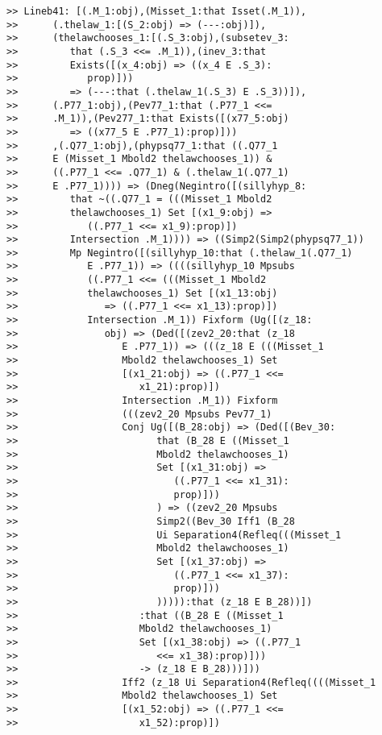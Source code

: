 \documentclass[12pt]{article}
\begin{document}
\begin{verbatim}
>> Lineb41: [(.M_1:obj),(Misset_1:that Isset(.M_1)),
>>      (.thelaw_1:[(S_2:obj) => (---:obj)]),
>>      (thelawchooses_1:[(.S_3:obj),(subsetev_3:
>>         that (.S_3 <<= .M_1)),(inev_3:that
>>         Exists([(x_4:obj) => ((x_4 E .S_3):
>>            prop)]))
>>         => (---:that (.thelaw_1(.S_3) E .S_3))]),
>>      (.P77_1:obj),(Pev77_1:that (.P77_1 <<=
>>      .M_1)),(Pev277_1:that Exists([(x77_5:obj)
>>         => ((x77_5 E .P77_1):prop)]))
>>      ,(.Q77_1:obj),(phypsq77_1:that ((.Q77_1
>>      E (Misset_1 Mbold2 thelawchooses_1)) &
>>      ((.P77_1 <<= .Q77_1) & (.thelaw_1(.Q77_1)
>>      E .P77_1)))) => (Dneg(Negintro([(sillyhyp_8:
>>         that ~((.Q77_1 = (((Misset_1 Mbold2
>>         thelawchooses_1) Set [(x1_9:obj) =>
>>            ((.P77_1 <<= x1_9):prop)])
>>         Intersection .M_1)))) => ((Simp2(Simp2(phypsq77_1))
>>         Mp Negintro([(sillyhyp_10:that (.thelaw_1(.Q77_1)
>>            E .P77_1)) => ((((sillyhyp_10 Mpsubs
>>            ((.P77_1 <<= (((Misset_1 Mbold2
>>            thelawchooses_1) Set [(x1_13:obj)
>>               => ((.P77_1 <<= x1_13):prop)])
>>            Intersection .M_1)) Fixform (Ug([(z_18:
>>               obj) => (Ded([(zev2_20:that (z_18
>>                  E .P77_1)) => (((z_18 E (((Misset_1
>>                  Mbold2 thelawchooses_1) Set
>>                  [(x1_21:obj) => ((.P77_1 <<=
>>                     x1_21):prop)])
>>                  Intersection .M_1)) Fixform
>>                  (((zev2_20 Mpsubs Pev77_1)
>>                  Conj Ug([(B_28:obj) => (Ded([(Bev_30:
>>                        that (B_28 E ((Misset_1
>>                        Mbold2 thelawchooses_1)
>>                        Set [(x1_31:obj) =>
>>                           ((.P77_1 <<= x1_31):
>>                           prop)]))
>>                        ) => ((zev2_20 Mpsubs
>>                        Simp2((Bev_30 Iff1 (B_28
>>                        Ui Separation4(Refleq(((Misset_1
>>                        Mbold2 thelawchooses_1)
>>                        Set [(x1_37:obj) =>
>>                           ((.P77_1 <<= x1_37):
>>                           prop)]))
>>                        ))))):that (z_18 E B_28))])
>>                     :that ((B_28 E ((Misset_1
>>                     Mbold2 thelawchooses_1)
>>                     Set [(x1_38:obj) => ((.P77_1
>>                        <<= x1_38):prop)]))
>>                     -> (z_18 E B_28)))]))
>>                  Iff2 (z_18 Ui Separation4(Refleq((((Misset_1
>>                  Mbold2 thelawchooses_1) Set
>>                  [(x1_52:obj) => ((.P77_1 <<=
>>                     x1_52):prop)])

\end{verbatim}
\end{document}
